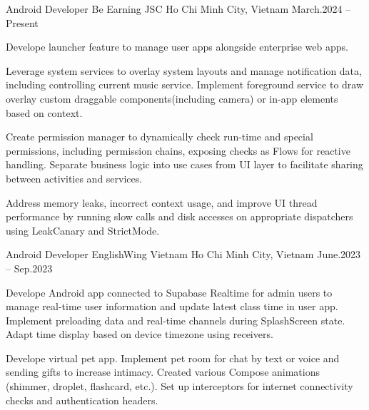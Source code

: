 \begin{cventries}

    \cventry
    {Android Developer}
    {Be Earning JSC}
    {Ho Chi Minh City, Vietnam}
    {March.2024 -- Present}
    {
        \begin{cvitems}
            \item {
                Develope launcher feature to manage user apps alongside enterprise web apps.
            }
            \item {
                Leverage system services to overlay system layouts and manage notification data, including controlling current music service.
                Implement foreground service to draw overlay custom draggable components(including camera) or in-app elements based on context.
            }
            \item {
                Create permission manager to dynamically check run-time and special permissions, including permission chains, exposing checks as Flows for reactive handling.
                Separate business logic into use cases from UI layer to facilitate sharing between activities and services.
            }
            \item {
                Address memory leaks, incorrect context usage, and improve UI thread performance by running slow calls and disk accesses on appropriate dispatchers using LeakCanary and StrictMode.
            }
        \end{cvitems}
    }

    \cventry
    {Android Developer}
    {EnglishWing Vietnam}
    {Ho Chi Minh City, Vietnam}
    {June.2023 -- Sep.2023}
    {
        \begin{cvitems}
            \item {
                Develope Android app connected to Supabase Realtime for admin users to manage real-time user information and update latest class time in user app.
                Implement preloading data and real-time channels during SplashScreen state.
                Adapt time display based on device timezone using receivers.
            }
            \item {
                Develope virtual pet app.
                Implement pet room for chat by text or voice and sending gifts to increase intimacy.
                Created various Compose animations (shimmer, droplet, flashcard, etc.).
                Set up interceptors for internet connectivity checks and authentication headers.
            }
        \end{cvitems}
    }


\end{cventries}
